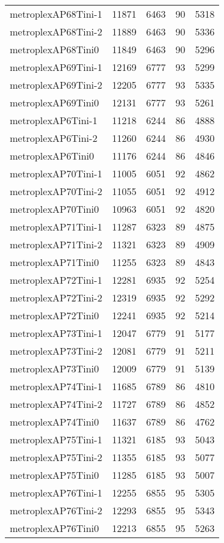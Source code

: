 \begin{longtable}{lrrrr}
metroplexAP68Tini-1 & 11871 & 6463 & 90 & 5318 \\
metroplexAP68Tini-2 & 11889 & 6463 & 90 & 5336 \\
metroplexAP68Tini0 & 11849 & 6463 & 90 & 5296 \\
metroplexAP69Tini-1 & 12169 & 6777 & 93 & 5299 \\
metroplexAP69Tini-2 & 12205 & 6777 & 93 & 5335 \\
metroplexAP69Tini0 & 12131 & 6777 & 93 & 5261 \\
metroplexAP6Tini-1 & 11218 & 6244 & 86 & 4888 \\
metroplexAP6Tini-2 & 11260 & 6244 & 86 & 4930 \\
metroplexAP6Tini0 & 11176 & 6244 & 86 & 4846 \\
metroplexAP70Tini-1 & 11005 & 6051 & 92 & 4862 \\
metroplexAP70Tini-2 & 11055 & 6051 & 92 & 4912 \\
metroplexAP70Tini0 & 10963 & 6051 & 92 & 4820 \\
metroplexAP71Tini-1 & 11287 & 6323 & 89 & 4875 \\
metroplexAP71Tini-2 & 11321 & 6323 & 89 & 4909 \\
metroplexAP71Tini0 & 11255 & 6323 & 89 & 4843 \\
metroplexAP72Tini-1 & 12281 & 6935 & 92 & 5254 \\
metroplexAP72Tini-2 & 12319 & 6935 & 92 & 5292 \\
metroplexAP72Tini0 & 12241 & 6935 & 92 & 5214 \\
metroplexAP73Tini-1 & 12047 & 6779 & 91 & 5177 \\
metroplexAP73Tini-2 & 12081 & 6779 & 91 & 5211 \\
metroplexAP73Tini0 & 12009 & 6779 & 91 & 5139 \\
metroplexAP74Tini-1 & 11685 & 6789 & 86 & 4810 \\
metroplexAP74Tini-2 & 11727 & 6789 & 86 & 4852 \\
metroplexAP74Tini0 & 11637 & 6789 & 86 & 4762 \\
metroplexAP75Tini-1 & 11321 & 6185 & 93 & 5043 \\
metroplexAP75Tini-2 & 11355 & 6185 & 93 & 5077 \\
metroplexAP75Tini0 & 11285 & 6185 & 93 & 5007 \\
metroplexAP76Tini-1 & 12255 & 6855 & 95 & 5305 \\
metroplexAP76Tini-2 & 12293 & 6855 & 95 & 5343 \\
metroplexAP76Tini0 & 12213 & 6855 & 95 & 5263 \\

\end{longtable}
